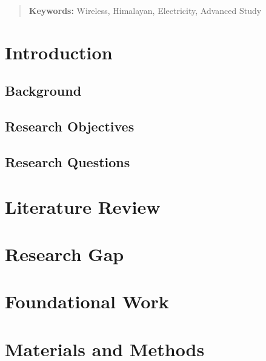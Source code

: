 \documentclass[12pt, a4paper]{article}
\author{}
\date{}
\renewcommand{\arraystretch}{1.5}
\begin{document}
\maketitle


\thispagestyle{empty}
\newpage

\begin{abstract}

\newline
\textbf{Keywords:} Wireless, Himalayan, Electricity, Advanced Study
\end{abstract}
\newpage

\tableofcontents
\newpage
\renewcommand{\arraystretch}{1.5}
\section{Introduction}
\subsection{Background}


\subsection{Research Objectives}


\subsection{Research Questions}


\section{Literature Review}


\section{Research Gap}


\section{Foundational Work}


\section{Materials and Methods}

\end{document}
